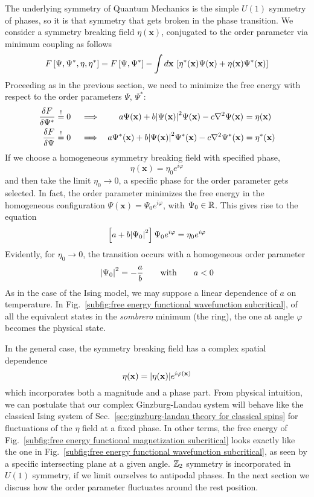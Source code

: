 The underlying symmetry of Quantum Mechanics is the simple $U(1)$ symmetry of phases, so it is that symmetry that gets broken in the phase transition. We consider a symmetry breaking field $\eta(\mathbf{x})$, conjugated to the order parameter via minimum coupling as follows
\[
    F\left[{\Psi,\Psi^*,\eta,\eta^*}\right] = F\left[{\Psi,\Psi^*}\right] - \int d\mathbf{x} \, \left[{ \eta^*(\mathbf{x}) \Psi(\mathbf{x}) + \eta(\mathbf{x}) \Psi^*(\mathbf{x}) }\right]
\]
Proceeding as in the previous section, we need to minimize the free energy with respect to the order parameters $\Psi$, $\Psi^*$:
\begin{align}
    \fdv{F}{\Psi^*} &\imp 0 &&\implies\hspace{2em}
    a \Psi(\mathbf{x}) + b \abs{\Psi(\mathbf{x})}^2 \Psi(\mathbf{x}) - c \laplacian \Psi(\mathbf{x}) \nquad&&= \eta(\mathbf{x}) \label{eq:free energy extremization ginzburg landau 1} \\
    \fdv{F}{\Psi} &\imp 0 &&\implies\hspace{0.67em}
    a \Psi^* (\mathbf{x}) + b \abs{\Psi(\mathbf{x})}^2 \Psi^* (\mathbf{x}) - c \laplacian \Psi^* (\mathbf{x}) \nquad&&= \eta^* (\mathbf{x}) \label{eq:free energy extremization ginzburg landau 2}
\end{align}
If we choose a homogeneous symmetry breaking field with specified phase,
\[
    \eta (\mathbf{x}) = \eta_0 e^{i\varphi}
\]
and then take the limit $\eta_0 \to 0$, a specific phase for the order parameter gets selected. In fact, the order parameter minimizes the free energy in the homogeneous configuration $\Psi(\mathbf{x}) = \Psi_0 e^{i\varphi}$, with $\Psi_0 \in \mathbb{R}$. This gives rise to the equation
\[
    \left[{ a + b \abs{\Psi_0}^2 }\right] \Psi_0 e^{i\varphi} = \eta_0 e^{i\varphi}
\]
Evidently, for $\eta_0 \to 0$, the transition occurs with a homogeneous order parameter
\[
    \abs{\Psi_0}^2 = - \frac{a}{b}
    \qquad\text{with}\qquad
    a < 0
\]
As in the case of the Ising model, we may suppose a linear dependence of $a$ on temperature. In Fig.~\ref{subfig:free energy functional wavefunction subcritical}, of all the equivalent states in the \textit{sombrero} minimum (the ring), the one at angle $\varphi$ becomes the physical state. 

In the general case, the symmetry breaking field has a complex spatial dependence
\[
    \eta (\mathbf{x}) = \abs{ \eta (\mathbf{x}) } e^{i \varphi(\mathbf{x})}
\]
which incorporates both a magnitude and a phase part. From physical intuition, we can postulate that our complex Ginzburg-Landau system will behave like the classical Ising system of Sec.~\ref{sec:ginzburg-landau theory for classical spins} for fluctuations of the $\eta$ field at a fixed phase. In other terms, the free energy of Fig.~\ref{subfig:free energy functional magnetization subcritical} looks exactly like the one in Fig.~\ref{subfig:free energy functional wavefunction subcritical}, as seen by a specific intersecting plane at a given angle. $\mathbb{Z}_2$ symmetry is incorporated in $U(1)$ symmetry, if we limit ourselves to antipodal phases. In the next section we discuss how the order parameter fluctuates around the rest position.

